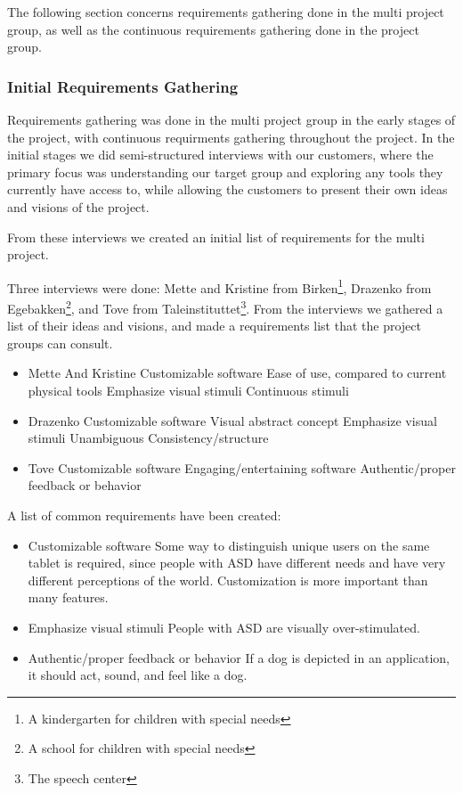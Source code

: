 The following section concerns requirements gathering done in the multi project group, as well as the continuous requirements gathering done in the project group.

\subsubsection*{Initial Requirements Gathering}
Requirements gathering was done in the multi project group in the early stages of the project, with continuous requirments gathering throughout the project.
In the initial stages we did semi-structured interviews with our customers, where the primary focus was understanding our target group and exploring any tools they currently have access to, while allowing the customers to present their own ideas and visions of the project.

From these interviews we created an initial list of requirements for the multi project.

Three interviews were done: Mette and Kristine from Birken\footnote{A kindergarten for children with special needs}, Drazenko from Egebakken\footnote{A school for children with special needs}, and Tove from Taleinstituttet\footnote{The speech center}.
From the interviews we gathered a list of their ideas and visions, and made a requirements list that the project groups can consult.

\begin{itemize}
 \item Mette And Kristine 
  \subitem Customizable software
  \subitem Ease of use, compared to current physical tools
  \subitem Emphasize visual stimuli
  \subitem Continuous stimuli 
 \item Drazenko
  \subitem Customizable software
  \subitem Visual abstract concept
  \subitem Emphasize visual stimuli
  \subitem Unambiguous
  \subitem Consistency/structure
 \item Tove 
  \subitem Customizable software
  \subitem Engaging/entertaining software
  \subitem Authentic/proper feedback or behavior
\end{itemize}

A list of common requirements have been created:

\begin{itemize}
 \item Customizable software
  \subitem Some way to distinguish unique users on the same tablet is required, since people with ASD have different needs and have very different perceptions of the world.
  \subitem Customization is more important than many features.
 \item Emphasize visual stimuli
  \subitem People with ASD are visually over-stimulated.
 \item Authentic/proper feedback or behavior
  \subitem If a dog is depicted in an application, it should act, sound, and feel like a dog.
\end{itemize}


